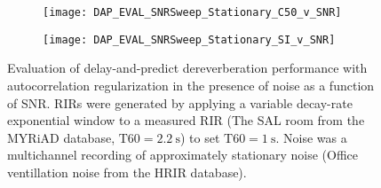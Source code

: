 


\begin{figure}[H]
	\centering
	\begin{subfigure}[b]{0.47\textwidth}
		\centering
		\texttt{[image: DAP\_EVAL\_SNRSweep\_Stationary\_C50\_v\_SNR]}
	\end{subfigure}
	\begin{subfigure}[b]{0.92\textwidth}
		\centering
		\texttt{[image: DAP\_EVAL\_SNRSweep\_Stationary\_SI\_v\_SNR]}
	\end{subfigure}
	\caption[DAP evaluation with stationary noise]{Evaluation of delay-and-predict dereverberation performance with autocorrelation regularization in the presence of noise as a function of SNR. RIRs were generated by applying a variable decay-rate exponential window to a measured RIR (The SAL room from the MYRiAD database, $\mathrm{T60} = \qty{2.2}{\second}$) to set $\mathrm{T60} = \qty{1}{\second}$. Noise was a multichannel recording of approximately stationary noise (Office ventillation noise from the HRIR database).}
	\label{fig:DAP_EVAL_SNRSweep_Stationary}
\end{figure}

